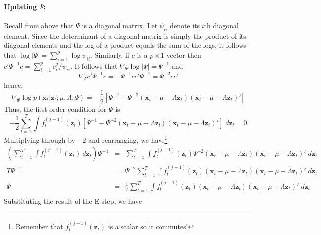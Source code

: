 \documentclass[12pt]{article}
\theoremstyle{definition}
\begin{document}
\paragraph{Updating $\Psi$:} Recall from above that $\Psi$ is a diagonal matrix. Let $\psi_{ii}$ denote its $i$th diagonal element. Since the determinant of a diagonal matrix is simply the product of its diagonal elements and the log of a product equals the sum of the logs, it follows that $\log |\Psi| = \sum_{i=1}^p \log \psi_{ii}$. Similarly, if $c$ is a $p\times 1$ vector then $c' \Psi^{-1} c = \sum_{i=1}^p c_i^2/\psi_{ii}$. It follows that $\nabla_\Psi \log |\Psi| = \Psi^{-1}$ and
	$$\nabla_\Psi c' \Psi^{-1} c = - \Psi^{-1} cc' \Psi^{-1} = \Psi^{-2} cc'$$
hence, 
	$$ \nabla_\Psi \log p(\textbf{x}_t| \textbf{z}_t;\mu, \Lambda, \Psi) = -\frac{1}{2} \left[ \Psi^{-1} - \Psi^{-2}(\mathbf{x}_t - \mu -  \Lambda \textbf{z}_t)(\mathbf{x}_t - \mu -  \Lambda \textbf{z}_t)' \right]$$
Thus, the first order condition for $\Psi$ is
$$-\frac{1}{2}\sum_{t=1}^T \int f_t^{(j-1)}(\textbf{z}_t)  \left[ \Psi^{-1} - \Psi^{-2}(\mathbf{x}_t - \mu -  \Lambda \textbf{z}_t)(\mathbf{x}_t - \mu -  \Lambda \textbf{z}_t)' \right]\;d \textbf{z}_t = 0$$
Multiplying through by $-2$ and rearranging, we have\footnote{Remember that $f_t^{(j-1)}(\textbf{z}_t)$ is a scalar so it commutes!}
\begin{eqnarray*}
	\left(\sum_{t=1}^T \int f_t^{(j-1)}(\textbf{z}_t) \;d \textbf{z}_t\right) \Psi^{-1}&=& \sum_{t=1}^T \int f_t^{(j-1)}(\textbf{z}_t)\Psi^{-2}(\mathbf{x}_t - \mu -  \Lambda \textbf{z}_t)(\mathbf{x}_t - \mu -  \Lambda \textbf{z}_t)' \;d \textbf{z}_t\\
	T\Psi^{-1}&=& \Psi^{-2}\sum_{t=1}^T \int f_t^{(j-1)}(\textbf{z}_t)(\mathbf{x}_t - \mu -  \Lambda \textbf{z}_t)(\mathbf{x}_t - \mu -  \Lambda \textbf{z}_t)' \;d \textbf{z}_t\\
	\Psi &=& \frac{1}{T}\sum_{t=1}^T \int f_t^{(j-1)}(\textbf{z}_t)(\mathbf{x}_t - \mu -  \Lambda \textbf{z}_t)(\mathbf{x}_t - \mu -  \Lambda \textbf{z}_t)' \;d \textbf{z}_t\\
\end{eqnarray*}
Substituting the result of the E-step, we have
\end{document}
